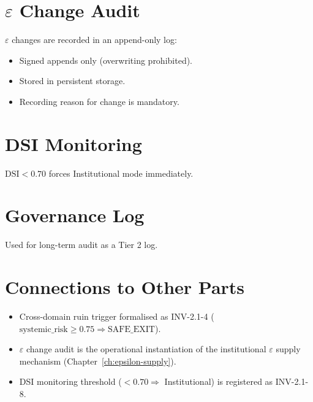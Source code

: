 \section{$\varepsilon$ Change Audit}
\label{sec:meta-epsilon-audit}

$\varepsilon$ changes are recorded in an append-only log:

\begin{itemize}
\item Signed appends only (overwriting prohibited).
\item Stored in persistent storage.
\item Recording reason for change is mandatory.
\end{itemize}

\section{DSI Monitoring}
\label{sec:meta-dsi-monitoring}

$\mathrm{DSI} < 0.70$ forces Institutional mode immediately.

\section{Governance Log}
\label{sec:meta-governance-log}

Used for long-term audit as a Tier 2 log.

\section*{Connections to Other Parts}

\begin{itemize}
\item Cross-domain ruin trigger formalised as INV-2.1-4
($\mathrm{systemic\_risk} \ge 0.75 \Rightarrow \mathrm{SAFE\_EXIT}$).
\item $\varepsilon$ change audit is the operational instantiation of
the institutional $\varepsilon$ supply mechanism
(Chapter~\ref{ch:epsilon-supply}).
\item DSI monitoring threshold ($< 0.70 \Rightarrow$ Institutional)
is registered as INV-2.1-8.
\end{itemize}
